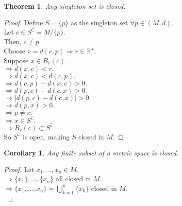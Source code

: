 \documentclass{article}
\newtheorem{theorem}{Theorem}[section]
\newtheorem{corollary}{Corollary}[theorem]
\begin{document}
			\begin{theorem}
				Any singleton set is closed.
			\end{theorem}
			\begin{proof}
				Define $S = \{p\}$ as the singleton set $\forall p \in (M, d)$. \\
				Let $c \in S^\complement = M / \{p\}$. \\
				Then, $c \neq p$. \\
				Choose $r = d(c, p) \Rightarrow r \in \mathbb{R}^+$. \\
				Suppose $x \in B_{r}(c)$. \\
				$\Rightarrow d(x, c) < r.$ \\
				$\Rightarrow d(x, c) < d(c, p).$ \\
				$\Rightarrow d(c, p) - d(x, c) > 0.$ \\
				$\Rightarrow d(p, c) - d(c, x) > 0.$ \\
				$\Rightarrow | d(p, c) - d(c, x) | > 0.$ \\
				$\Rightarrow d(p, x) > 0.$ \\
				$\Rightarrow p \neq x.$ \\
				$\Rightarrow x \in S^\complement.$ \\
				$\Rightarrow B_{r}(c) \subset S^\complement.$ \\
				So $S^\complement$ is open, making $S$ closed in $M$.
			\end{proof}

			\begin{corollary}
				Any finite subset of a metric space is closed.
			\end{corollary}
			\begin{proof}
				Let $x_1, \ldots, x_n \in M$. \\
				$\Rightarrow \{x_1\}, \ldots, \{x_n\}$ all closed in $M$. \\
				$\Rightarrow \{ x_1, \ldots, x_n \} = \bigcup_{k=1}^{n} \{x_k\}$ closed in $M$. \\
			\end{proof}
\end{document}
